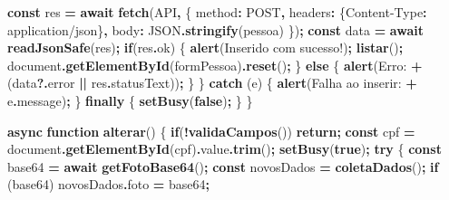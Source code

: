 \documentclass[
]{book}
\newenvironment{Shaded}{\begin{snugshade}}{\end{snugshade}}
\newcommand{\AttributeTok}[1]{\textcolor[rgb]{0.13,0.29,0.53}{#1}}
\newcommand{\BuiltInTok}[1]{#1}
\newcommand{\ControlFlowTok}[1]{\textcolor[rgb]{0.13,0.29,0.53}{\textbf{#1}}}
\newcommand{\DataTypeTok}[1]{\textcolor[rgb]{0.13,0.29,0.53}{#1}}
\newcommand{\FunctionTok}[1]{\textcolor[rgb]{0.13,0.29,0.53}{\textbf{#1}}}
\newcommand{\KeywordTok}[1]{\textcolor[rgb]{0.13,0.29,0.53}{\textbf{#1}}}
\newcommand{\NormalTok}[1]{#1}
\newcommand{\OperatorTok}[1]{\textcolor[rgb]{0.81,0.36,0.00}{\textbf{#1}}}
\newcommand{\StringTok}[1]{\textcolor[rgb]{0.31,0.60,0.02}{#1}}
\begin{document}
\begin{Shaded}
\begin{Highlighting}[]
    \KeywordTok{const}\NormalTok{ res }\OperatorTok{=} \ControlFlowTok{await} \FunctionTok{fetch}\NormalTok{(API}\OperatorTok{,}\NormalTok{ \{}
      \DataTypeTok{method}\OperatorTok{:} \StringTok{\textquotesingle{}POST\textquotesingle{}}\OperatorTok{,}
      \DataTypeTok{headers}\OperatorTok{:}\NormalTok{ \{}\StringTok{\textquotesingle{}Content{-}Type\textquotesingle{}}\OperatorTok{:} \StringTok{\textquotesingle{}application/json\textquotesingle{}}\NormalTok{\}}\OperatorTok{,}
      \DataTypeTok{body}\OperatorTok{:} \BuiltInTok{JSON}\OperatorTok{.}\FunctionTok{stringify}\NormalTok{(pessoa)}
\NormalTok{    \})}\OperatorTok{;}
    \KeywordTok{const}\NormalTok{ data }\OperatorTok{=} \ControlFlowTok{await} \FunctionTok{readJsonSafe}\NormalTok{(res)}\OperatorTok{;}
    \ControlFlowTok{if}\NormalTok{(res}\OperatorTok{.}\AttributeTok{ok}\NormalTok{) \{}
      \FunctionTok{alert}\NormalTok{(}\StringTok{\textquotesingle{}Inserido com sucesso!\textquotesingle{}}\NormalTok{)}\OperatorTok{;}
      \FunctionTok{listar}\NormalTok{()}\OperatorTok{;}
      \BuiltInTok{document}\OperatorTok{.}\FunctionTok{getElementById}\NormalTok{(}\StringTok{\textquotesingle{}formPessoa\textquotesingle{}}\NormalTok{)}\OperatorTok{.}\FunctionTok{reset}\NormalTok{()}\OperatorTok{;}
\NormalTok{    \} }\ControlFlowTok{else}\NormalTok{ \{}
      \FunctionTok{alert}\NormalTok{(}\StringTok{\textquotesingle{}Erro: \textquotesingle{}} \OperatorTok{+}\NormalTok{ (data}\OperatorTok{?.}\AttributeTok{error} \OperatorTok{||}\NormalTok{ res}\OperatorTok{.}\AttributeTok{statusText}\NormalTok{))}\OperatorTok{;}
\NormalTok{    \}}
\NormalTok{  \} }\ControlFlowTok{catch}\NormalTok{ (e) \{}
    \FunctionTok{alert}\NormalTok{(}\StringTok{\textquotesingle{}Falha ao inserir: \textquotesingle{}} \OperatorTok{+}\NormalTok{ e}\OperatorTok{.}\AttributeTok{message}\NormalTok{)}\OperatorTok{;}
\NormalTok{  \} }\ControlFlowTok{finally}\NormalTok{ \{}
    \FunctionTok{setBusy}\NormalTok{(}\KeywordTok{false}\NormalTok{)}\OperatorTok{;}
\NormalTok{  \}}
\NormalTok{\}}

\KeywordTok{async} \KeywordTok{function} \FunctionTok{alterar}\NormalTok{() \{}
  \ControlFlowTok{if}\NormalTok{(}\OperatorTok{!}\FunctionTok{validaCampos}\NormalTok{()) }\ControlFlowTok{return}\OperatorTok{;}
  \KeywordTok{const}\NormalTok{ cpf }\OperatorTok{=} \BuiltInTok{document}\OperatorTok{.}\FunctionTok{getElementById}\NormalTok{(}\StringTok{\textquotesingle{}cpf\textquotesingle{}}\NormalTok{)}\OperatorTok{.}\AttributeTok{value}\OperatorTok{.}\FunctionTok{trim}\NormalTok{()}\OperatorTok{;}
  \FunctionTok{setBusy}\NormalTok{(}\KeywordTok{true}\NormalTok{)}\OperatorTok{;}
  \ControlFlowTok{try}\NormalTok{ \{}
    \KeywordTok{const}\NormalTok{ base64 }\OperatorTok{=} \ControlFlowTok{await} \FunctionTok{getFotoBase64}\NormalTok{()}\OperatorTok{;}
    \KeywordTok{const}\NormalTok{ novosDados }\OperatorTok{=} \FunctionTok{coletaDados}\NormalTok{()}\OperatorTok{;}
    \ControlFlowTok{if}\NormalTok{ (base64) novosDados}\OperatorTok{.}\AttributeTok{foto} \OperatorTok{=}\NormalTok{ base64}\OperatorTok{;}


\end{Highlighting}
\end{Shaded}
\end{document}
